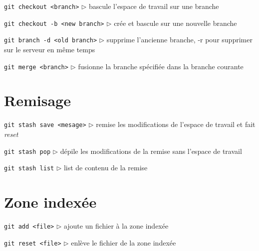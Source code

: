 \documentclass[a4paper,oneside,twocolumn]{article}
\begin{document}
\noindent\verb?git checkout <branch>?\linebreak
$\triangleright$ bascule l'espace de travail sur une branche

\noindent\verb?git checkout -b <new branch>?\linebreak
$\triangleright$ crée et bascule sur une nouvelle branche

\noindent\verb?git branch -d <old branch>?\linebreak
$\triangleright$ supprime l'ancienne branche, -r pour supprimer sur le serveur en même temps

\noindent\verb?git merge <branch>?\linebreak
$\triangleright$ fusionne la branche spécifiée dans la branche courante

\vspace{-3mm}
\section{Remisage}
\vspace{-2mm}

\noindent\verb?git stash save <mesage>?\linebreak
$\triangleright$ remise les modifications de l'espace de travail et fait \emph{reset}

\noindent\verb?git stash pop?\linebreak
$\triangleright$ dépile les modifications de la remise sans l'espace de travail

\noindent\verb?git stash list?\linebreak
$\triangleright$ list de contenu de la remise

\vspace{-3mm}
\section{Zone indexée}
\vspace{-2mm}

\noindent\verb?git add <file>?\linebreak
$\triangleright$ ajoute un fichier à la zone indexée


\noindent\verb?git reset <file>?\linebreak
$\triangleright$ enlève le fichier de la zone indexée
\end{document}
